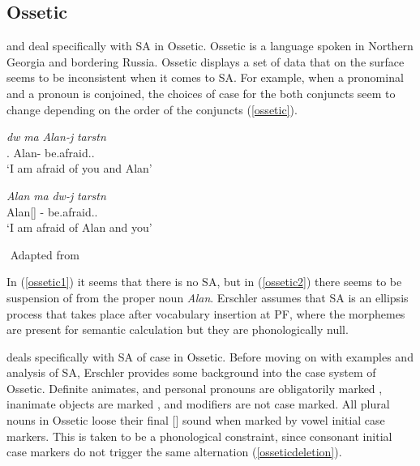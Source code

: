 \subsection{Ossetic}

\cite{erschler2012suspended} and \cite{erschler2018suspended} deal specifically with SA in Ossetic. Ossetic is a language spoken in Northern Georgia and bordering Russia. Ossetic displays a set of data that on the surface seems to be inconsistent when it comes to SA. For example, when a pronominal and a pronoun is conjoined, the choices of case for the both conjuncts seem to change depending on the order of the conjuncts (\ref{ossetic}).

\begin{exe}
    \ex \label{ossetic}
    \begin{xlist}
        \ex \label{ossetic1}
        \gll 
        \textit{d\textturna w} \textit{\textturna ma} \textit{Alan-\textturna j} \textit{tarst\textturna n} \\
        {\Second}{\Sg}.{\Obl} {\And} Alan-{\Abl} be.afraid.{\Pst}.{\First}{\Sg} \\
        \glt `I am afraid of you and Alan'
        
        \ex \label{ossetic2}
        \gll 
        \textit{Alan} \textit{\textturna ma} \textit{d\textturna w-\textturna j} \textit{tarst\textturna n} \\
        Alan[{\Nom}] {\And} {\Second}{\Sg}-{\Abl} be.afraid.{\Pst}.{\First}{\Sg} \\
        \glt `I am afraid of Alan and you'
    \end{xlist}
    ${}$ \hfill Adapted from \cite{erschler2012suspended}
\end{exe}

In (\ref{ossetic1}) it seems that there is no SA, but in (\ref{ossetic2}) there seems to be suspension of {\Abl} from the proper noun \textit{Alan}. Erschler assumes that SA is an ellipsis process that takes place after vocabulary insertion at PF, where the morphemes are present for semantic calculation but they are phonologically null. 

\cite{erschler2012suspended} deals specifically with SA of case in Ossetic. Before moving on with examples and analysis of SA, Erschler provides some background into the case system of Ossetic. Definite animates, and personal pronouns are obligatorily marked {\Obl}, inanimate objects are marked {\Nom}, and modifiers are not case marked. All plural nouns in Ossetic loose their final [\textturna] sound when marked by vowel initial case markers. This is taken to be a phonological constraint, since consonant initial case markers do not trigger the same alternation (\ref{osseticdeletion}).


